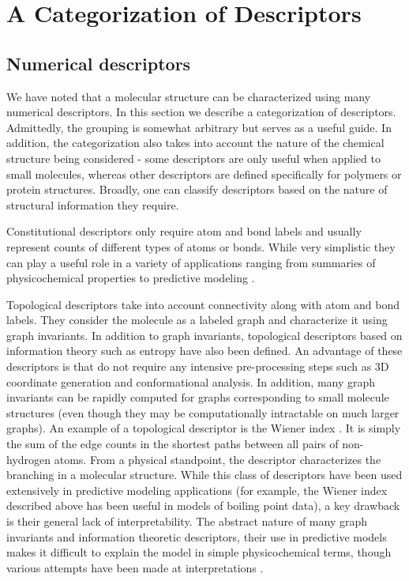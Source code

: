 \documentclass[letterpaper, 12pt]{article}
\begin{document}
\section{A Categorization of Descriptors}
\label{sec:categ-descr}

\subsection{Numerical descriptors}
\label{sec:numer-descr}


We have noted that a molecular structure can be characterized using
many numerical descriptors. In this section we describe a
categorization of descriptors. Admittedly, the grouping is somewhat
arbitrary but serves as a useful guide. In addition, the
categorization also takes into account the nature of the chemical
structure being considered - some descriptors are only useful when
applied to small molecules, whereas other descriptors are defined
specifically for polymers or protein structures.  Broadly, one can
classify descriptors based on the nature of structural information
they require.

Constitutional descriptors only require atom and bond labels and
usually represent counts of different types of atoms or bonds. While
very simplistic they can play a useful role in a variety of
applications ranging from summaries of physicochemical properties to
predictive modeling \cite{Bender:2005aa}.

Topological descriptors take into account connectivity along with atom
and bond labels. They consider the molecule as a labeled graph and
characterize it using graph invariants. In addition to graph
invariants, topological descriptors based on information theory such
as entropy have also been defined\cite{Dehmer:2009uq}. An advantage of
these descriptors is that do not require any intensive pre-processing
steps such as 3D coordinate generation and conformational analysis. In
addition, many graph invariants can be rapidly computed for graphs
corresponding to small molecule structures (even though they may be
computationally intractable on much larger graphs). An example of a
topological descriptor is the Wiener index
\cite{Nikolic:2001aa,Wiener:1947aa}. It is simply the sum of the edge
counts in the shortest paths between all pairs of non-hydrogen
atoms. From a physical standpoint, the descriptor characterizes the
branching in a molecular structure. While this class of descriptors
have been used extensively in predictive modeling applications
\cite{Garcia-Domenech:2008aa,Randic:2001ad,Besalu:2001aa} (for
example, the Wiener index described above has been useful in models of
boiling point data), a key drawback is their general lack of
interpretability. The abstract nature of many graph invariants and
information theoretic descriptors, their use in predictive models
makes it difficult to explain the model in simple physicochemical
terms, though various attempts have been made at interpretations
\cite{Todeschini:1975dq,Stanton:2003aa}.
\end{document}
